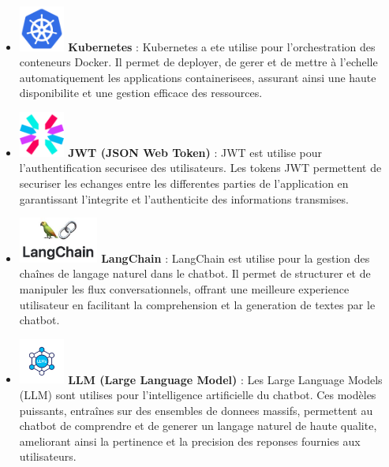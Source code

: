 \documentclass[a4paper, 11pt, openany]{report}
\begin{document}
\begin{itemize}
    \item \includegraphics[height=1.5cm]{assets/images/kubernetes.png} \hspace{5pt} \textbf{Kubernetes} : 
    Kubernetes a ete utilise pour l'orchestration des conteneurs Docker. Il permet de deployer, de gerer et de mettre à l'echelle automatiquement les applications containerisees, assurant ainsi une haute disponibilite et une gestion efficace des ressources.

    \item \includegraphics[height=1.5cm]{assets/images/jwt.png} \hspace{5pt} \textbf{JWT (JSON Web Token)}  : 
    JWT est utilise pour l'authentification securisee des utilisateurs. Les tokens JWT permettent de securiser les echanges entre les differentes parties de l'application en garantissant l'integrite et l'authenticite des informations transmises.


\item \includegraphics[height=1.5cm]{assets/images/langchain.jpeg} \hspace{5pt} \textbf{LangChain}  : 
LangChain est utilise pour la gestion des chaînes de langage naturel dans le chatbot. Il permet de structurer et de manipuler les flux conversationnels, offrant une meilleure experience utilisateur en facilitant la comprehension et la generation de textes par le chatbot.

\item \includegraphics[height=1.5cm]{assets/images/llm.png} \hspace{5pt} \textbf{LLM (Large Language Model)} : 
Les Large Language Models (LLM) sont utilises pour l'intelligence artificielle du chatbot. Ces modèles puissants, entraînes sur des ensembles de donnees massifs, permettent au chatbot de comprendre et de generer un langage naturel de haute qualite, ameliorant ainsi la pertinence et la precision des reponses fournies aux utilisateurs.


\end{itemize}
\end{document}
